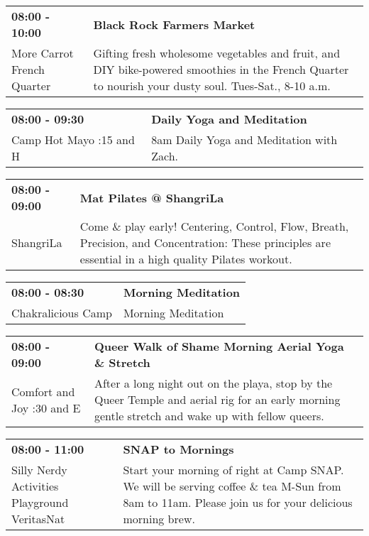 \begin{tabular}{ p{1in} p{2.2in} }
    \textbf{08:00 - 10:00} & \textbf{Black Rock Farmers Market} \\
    More Carrot \newline French Quarter & Gifting fresh wholesome vegetables and fruit, and DIY bike-powered smoothies in the French Quarter to nourish your dusty soul. Tues-Sat., 8-10 a.m. \\
    \hline 
\end{tabular}
    
\begin{tabular}{ p{1in} p{2.2in} }
    \textbf{08:00 - 09:30} & \textbf{Daily Yoga and Meditation} \\
    Camp Hot Mayo \newline 9:15 and H & 8am Daily Yoga and Meditation with Zach. \\
    \hline 
\end{tabular}
    
\begin{tabular}{ p{1in} p{2.2in} }
    \textbf{08:00 - 09:00} & \textbf{Mat Pilates @ ShangriLa} \\
    ShangriLa \newline  & Come \& play early! Centering, Control, Flow, Breath, Precision, and Concentration: These principles are essential in a high quality Pilates workout. \\
    \hline 
\end{tabular}
    
\begin{tabular}{ p{1in} p{2.2in} }
    \textbf{08:00 - 08:30} & \textbf{Morning Meditation} \\
    Chakralicious Camp \newline  & Morning Meditation \\
    \hline 
\end{tabular}
    
\begin{tabular}{ p{1in} p{2.2in} }
    \textbf{08:00 - 09:00} & \textbf{Queer Walk of Shame Morning Aerial Yoga \& Stretch} \\
    Comfort and Joy \newline 7:30 and E & After a long night out on the playa, stop by the Queer Temple and aerial rig for an early morning gentle stretch and wake up with fellow queers. \\
    \hline 
\end{tabular}
    
\begin{tabular}{ p{1in} p{2.2in} }
    \textbf{08:00 - 11:00} & \textbf{SNAP to Mornings} \\
    Silly Nerdy Activities Playground \newline VeritasNat & Start your morning of right at Camp SNAP. We will be serving coffee \& tea M-Sun from 8am to 11am. Please join us for your delicious morning brew. \\
    \hline 
\end{tabular}
    
